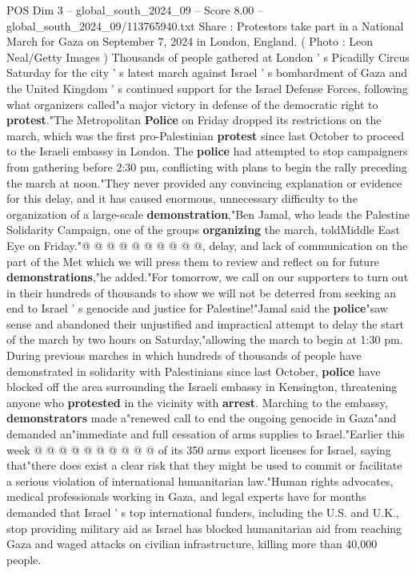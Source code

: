 \begin{textsample}{POS Dim 3 – global\_south\_2024\_09 – Score 8.00 – global\_south\_2024\_09/113765940.txt}  \label{ex:f3_pos_326}
Share : Protestors take part in a National March for Gaza on September 7, 2024 in London, England. ( Photo : Leon Neal/Getty Images ) Thousands of people gathered at London ' s Picadilly Circus Saturday for the city ' s latest march against Israel ' s bombardment of Gaza and the United Kingdom ' s continued support for the Israel Defense Forces, following what organizers called"a major victory in defense of the democratic right to \textbf{protest}."The Metropolitan \textbf{Police} on Friday dropped its restrictions on the march, which was the first pro-Palestinian \textbf{protest} since last October to proceed to the Israeli embassy in London.
The \textbf{police} had attempted to stop campaigners from gathering before 2:30 pm, conflicting with plans to begin the rally preceding the march at noon."They never provided any convincing explanation or evidence for this delay, and it has caused enormous, unnecessary difficulty to the organization of a large-scale \textbf{demonstration},"Ben Jamal, who leads the Palestine Solidarity Campaign, one of the groups \textbf{organizing} the march, toldMiddle East Eye on Friday."@ @ @ @ @ @ @ @ @ @, delay, and lack of communication on the part of the Met which we will press them to review and reflect on for future \textbf{demonstrations},"he added."For tomorrow, we call on our supporters to turn out in their hundreds of thousands to show we will not be deterred from seeking an end to Israel ' s genocide and justice for Palestine!"Jamal said the \textbf{police}"saw sense and abandoned their unjustified and impractical attempt to delay the start of the march by two hours on Saturday,"allowing the march to begin at 1:30 pm.
During previous marches in which hundreds of thousands of people have demonstrated in solidarity with Palestinians since last October, \textbf{police} have blocked off the area surrounding the Israeli embassy in Kensington, threatening anyone who \textbf{protested} in the vicinity with \textbf{arrest}.
Marching to the embassy, \textbf{demonstrators} made a"renewed call to end the ongoing genocide in Gaza"and demanded an"immediate and full cessation of arms supplies to Israel."Earlier this week @ @ @ @ @ @ @ @ @ @ of its 350 arms export licenses for Israel, saying that"there does exist a clear risk that they might be used to commit or facilitate a serious violation of international humanitarian law."Human rights advocates, medical professionals working in Gaza, and legal experts have for months demanded that Israel ' s top international funders, including the U.S. and U.K., stop providing military aid as Israel has blocked humanitarian aid from reaching Gaza and waged attacks on civilian infrastructure, killing more than 40,000 people.

\end{textsample}
